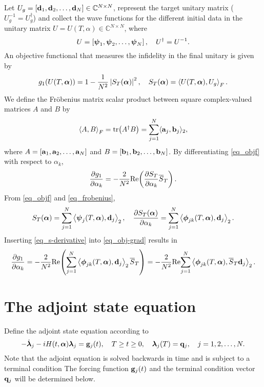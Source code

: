 \documentclass[11pt]{article}
\begin{document}
Let $U_g = [{\mathbf d}_1, {\mathbf d}_2, \ldots, {\mathbf d}_N]\in \mathbb{C}^{N\times N}$, represent the target unitary
matrix ($U_g^{-1} = U_g^\dag$) and collect the wave functions for the different initial data in the
unitary matrix $U = U(T,\alpha) \in \mathbb C^{N\times N}$, where
\[
U = \left[ \boldsymbol{\psi}_1, \boldsymbol{\psi}_2, \ldots, \boldsymbol{\psi}_N \right],\quad U^\dag = U^{-1}.
\]
An objective functional that measures the infidelity in the final unitary is given by
\begin{equation}\label{eq_objf}
g_1(U(T,\boldsymbol{\alpha})) = 1 - \frac{1}{N^2} \left| S_T(\boldsymbol{\alpha}) \right|^2,\quad S_T(\boldsymbol{\alpha}) = \left\langle U(T,\boldsymbol{\alpha}), U_g \right\rangle_F.
\end{equation}
We define the Fr\"obenius matrix scalar product between square complex-valued matrices $A$ and $B$ by
\begin{equation}\label{eq_frobenius}
\left\langle A, B\right\rangle_F = \mbox{tr$\left( A^\dag B\right)$} = \sum_{j=1}^N \langle {\mathbf a}_j, {\mathbf b}_j\rangle_2,
\end{equation}
where $A=[{\mathbf a}_1, {\mathbf a}_2, \ldots, {\mathbf a}_N]$ and  $B=[{\mathbf b}_1, {\mathbf b}_2, \ldots, {\mathbf b}_N]$. By differentiating
\eqref{eq_objf} with respect to $\alpha_k$,
\begin{equation}\label{eq_obj-grad}
\frac{\partial g_1}{\partial \alpha_k} = - \frac{2}{N^2} {\rm Re}\! \left(\frac{\partial S_T}{\partial \alpha_k} \overline{S}_T \right).
\end{equation}
From \eqref{eq_objf} and \eqref{eq_frobenius},
\begin{equation} \label{eq_s-derivative}
  S_T(\boldsymbol{\alpha}) = \sum_{j=1}^N \left\langle \boldsymbol{\psi}_j(T,\boldsymbol{\alpha}), {\mathbf d}_j \right\rangle_2,\quad
  \frac{\partial S_T(\boldsymbol{\alpha})}{\partial \alpha_k} = \sum_{j=1}^N \left\langle \boldsymbol{\phi}_{jk}(T,\boldsymbol{\alpha}), {\mathbf d}_j \right\rangle_2.
\end{equation}
Inserting \eqref{eq_s-derivative} into \eqref{eq_obj-grad} results in
\begin{equation}\label{eq_obj-grad-exp}
  \frac{\partial g_1}{\partial \alpha_k} = - \frac{2}{N^2} {\rm Re}\! \left(\sum_{j=1}^N \left\langle
  \boldsymbol{\phi}_{jk}(T,\boldsymbol{\alpha}), {\mathbf d}_j \right\rangle_2 \overline{S}_T \right)
  = - \frac{2}{N^2} {\rm Re}\! \sum_{j=1}^N \left\langle \boldsymbol{\phi}_{jk}(T,\boldsymbol{\alpha}), \overline{S}_T {\mathbf d}_j \right\rangle_2.  
\end{equation}

\section{The adjoint state equation}
Define the adjoint state equation according to
\begin{equation}\label{eq_adjoint}
-\dot{\boldsymbol{\lambda}}_j - iH(t,\boldsymbol{\alpha})\boldsymbol{\lambda}_j={\mathbf g}_j(t),\quad T\geq t\geq 0, \quad \boldsymbol{\lambda}_j(T)={\mathbf q}_j,\quad j=1,2,\ldots,N.
\end{equation}
Note that the adjoint equation is solved backwards in time and is subject to a terminal condition
The forcing function ${\mathbf g}_j(t)$ and the terminal condition vector ${\mathbf q}_j$ will be determined below.
\end{document}
